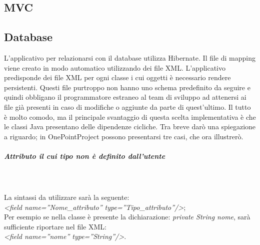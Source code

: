 \subsection{MVC}

\subsection{Database}
L\textquoteright{}applicativo per relazionarsi con il database utilizza Hibernate. Il file di mapping viene creato in modo automatico utilizzando dei file XML. L\textquoteright{}applicativo predisponde dei file XML per ogni classe i cui oggetti \`{e} necessario rendere persistenti. Questi file purtroppo non hanno uno schema predefinito da seguire e quindi obbligano il programmatore estraneo al team di sviluppo ad attenersi ai file gi\`{a} presenti in caso di modifiche o aggiunte da parte di quest\textquoteright{}ultimo. Il tutto \`{e} molto comodo, ma il principale svantaggio di questa scelta implementativa \`{e} che le classi Java presentano delle dipendenze cicliche. Tra breve dar\`{o} una spiegazione a riguardo; in OnePointProject possono presentarsi tre casi, che ora illustrer\`{o}.

\subparagraph{Attributo il cui tipo non \`{e} definito dall\textquoteright{}utente} \quad \quad \\ \\
La sintassi da utilizzare sar\`{a} la seguente: \\
\textit{<field name=''Nome\_attributo'' type=''Tipo\_attributo''/>}; \\
Per esempio se nella classe \`{e} presente la dichiarazione: \textit{private String nome}, sar\`{a} sufficiente riportare nel file XML: \\
\textit{<field name=''nome'' type=''String''/>}.

